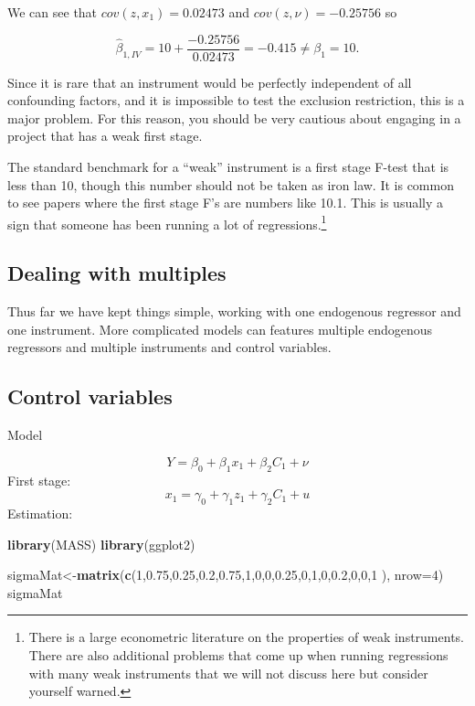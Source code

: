 \documentclass[
]{article}
\newenvironment{Shaded}{\begin{snugshade}}{\end{snugshade}}
\newcommand{\DataTypeTok}[1]{\textcolor[rgb]{0.13,0.29,0.53}{#1}}
\newcommand{\DecValTok}[1]{\textcolor[rgb]{0.00,0.00,0.81}{#1}}
\newcommand{\FloatTok}[1]{\textcolor[rgb]{0.00,0.00,0.81}{#1}}
\newcommand{\KeywordTok}[1]{\textcolor[rgb]{0.13,0.29,0.53}{\textbf{#1}}}
\newcommand{\NormalTok}[1]{#1}
\begin{document}
We can see that \(cov(z,x_1)= 0.02473\) and \(cov(z,\nu)=-0.25756\) so

\[
\hat{\beta}_{1,IV}=10+\frac{-0.25756}{0.02473}=-0.415\neq\beta_1=10.
\]

Since it is rare that an instrument would be perfectly independent of
all confounding factors, and it is impossible to test the exclusion
restriction, this is a major problem. For this reason, you should be
very cautious about engaging in a project that has a weak first stage.

The standard benchmark for a ``weak'' instrument is a first stage F-test
that is less than 10, though this number should not be taken as iron
law. It is common to see papers where the first stage F's are numbers
like 10.1. This is usually a sign that someone has been running a lot of
regressions.\footnote{There is a large econometric literature on the
  properties of weak instruments. There are also additional problems
  that come up when running regressions with many weak instruments that
  we will not discuss here but consider yourself warned.}

\subsection{Dealing with multiples}

Thus far we have kept things simple, working with one endogenous
regressor and one instrument. More complicated models can features
multiple endogenous regressors and multiple instruments and control
variables.

\subsection{Control variables}

Model

\[
Y=\beta_0+\beta_1 x_{1}+\beta_2C_1+\nu
\] First stage: \[
x_1=\gamma_0+\gamma_1z_1+\gamma_2C_1+u
\] Estimation:

\begin{Shaded}
\begin{Highlighting}[]
\KeywordTok{library}\NormalTok{(MASS)}
\KeywordTok{library}\NormalTok{(ggplot2)}

\NormalTok{sigmaMat\textless{}{-}}\KeywordTok{matrix}\NormalTok{(}\KeywordTok{c}\NormalTok{(}\DecValTok{1}\NormalTok{,}\FloatTok{0.75}\NormalTok{,}\FloatTok{0.25}\NormalTok{,}\FloatTok{0.2}\NormalTok{,}\FloatTok{0.75}\NormalTok{,}\DecValTok{1}\NormalTok{,}\DecValTok{0}\NormalTok{,}\DecValTok{0}\NormalTok{,}\FloatTok{0.25}\NormalTok{,}\DecValTok{0}\NormalTok{,}\DecValTok{1}\NormalTok{,}\DecValTok{0}\NormalTok{,}\FloatTok{0.2}\NormalTok{,}\DecValTok{0}\NormalTok{,}\DecValTok{0}\NormalTok{,}\DecValTok{1}\NormalTok{ ), }\DataTypeTok{nrow=}\DecValTok{4}\NormalTok{)}
\NormalTok{sigmaMat}
\end{Highlighting}
\end{Shaded}
\end{document}
